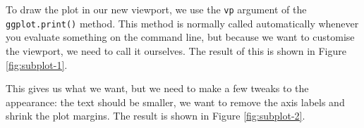 To draw the plot in our new viewport, we use the \texttt{vp} argument of
the \texttt{ggplot.print()} method. This method is normally called
automatically whenever you evaluate something on the command line, but
because we want to customise the viewport, we need to call it ourselves.
The result of this is shown in Figure \ref{fig:subplot-1}.

\begin{Shaded}
\begin{Highlighting}[]
\NormalTok{(}\NormalTok{, } \NormalTok{, } \NormalTok{)}
\StringTok{ }\NormalTok{(} \NormalTok{, } \NormalTok{, } \NormalTok{, } \NormalTok{)}
 
\NormalTok{()}
\end{Highlighting}
\end{Shaded}

This gives us what we want, but we need to make a few tweaks to the
appearance: the text should be smaller, we want to remove the axis
labels and shrink the plot margins. The result is shown in Figure
\ref{fig:subplot-2}.

\begin{Shaded}
\begin{Highlighting}[]
\StringTok{ }\StringTok{ }
\StringTok{  }\NormalTok{(}\NormalTok{) +}\StringTok{ }
\StringTok{  }\NormalTok{(} \NormalTok{, } \NormalTok{) +}\StringTok{ }
\StringTok{  }\NormalTok{(} \NormalTok{(}\NormalTok{(}\NormalTok{/}\NormalTok{, }\NormalTok{, }\NormalTok{, }\NormalTok{), }\NormalTok{))}

\NormalTok{(}\NormalTok{, } \NormalTok{, } \NormalTok{)}
 
\NormalTok{()}
\end{Highlighting}
\end{Shaded}


